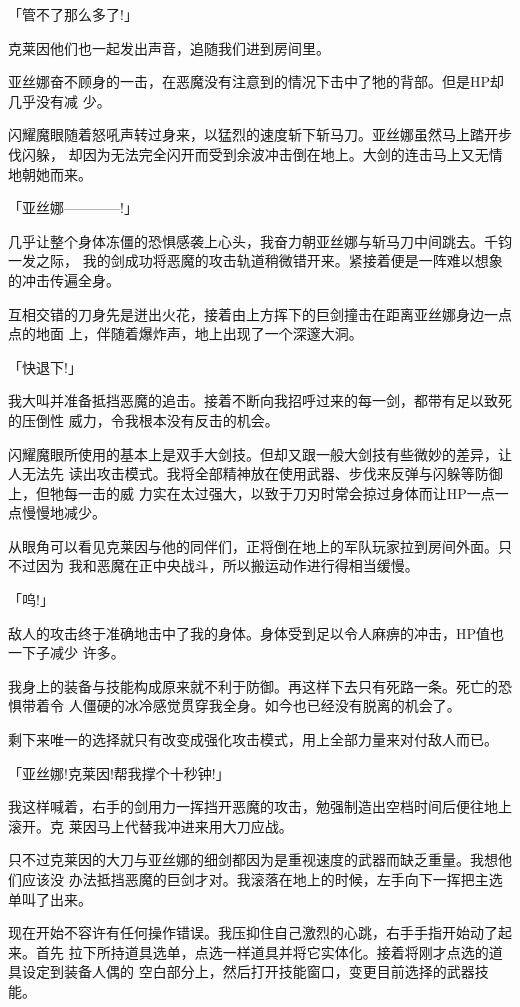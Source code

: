 \documentclass[11pt]{book}
\begin{document}
「管不了那么多了!」

克莱因他们也一起发出声音，追随我们进到房间里。

亚丝娜奋不顾身的一击，在恶魔没有注意到的情况下击中了牠的背部。但是HP却几乎没有减
少。

闪耀魔眼随着怒吼声转过身来，以猛烈的速度斩下斩马刀。亚丝娜虽然马上踏开步伐闪躲，
却因为无法完全闪开而受到余波冲击倒在地上。大剑的连击马上又无情地朝她而来。

「亚丝娜————!」

几乎让整个身体冻僵的恐惧感袭上心头，我奋力朝亚丝娜与斩马刀中间跳去。千钧一发之际，
我的剑成功将恶魔的攻击轨道稍微错开来。紧接着便是一阵难以想象的冲击传遍全身。

互相交错的刀身先是迸出火花，接着由上方挥下的巨剑撞击在距离亚丝娜身边一点点的地面
上，伴随着爆炸声，地上出现了一个深邃大洞。

「快退下!」

我大叫并准备抵挡恶魔的追击。接着不断向我招呼过来的每一剑，都带有足以致死的压倒性
威力，令我根本没有反击的机会。

闪耀魔眼所使用的基本上是双手大剑技。但却又跟一般大剑技有些微妙的差异，让人无法先
读出攻击模式。我将全部精神放在使用武器、步伐来反弹与闪躲等防御上，但牠每一击的威
力实在太过强大，以致于刀刃时常会掠过身体而让HP一点一点慢慢地减少。

从眼角可以看见克莱因与他的同伴们，正将倒在地上的军队玩家拉到房间外面。只不过因为
我和恶魔在正中央战斗，所以搬运动作进行得相当缓慢。

「呜!」

敌人的攻击终于准确地击中了我的身体。身体受到足以令人麻痹的冲击，HP值也一下子减少
许多。

我身上的装备与技能构成原来就不利于防御。再这样下去只有死路一条。死亡的恐惧带着令
人僵硬的冰冷感觉贯穿我全身。如今也已经没有脱离的机会了。

剩下来唯一的选择就只有改变成强化攻击模式，用上全部力量来对付敌人而已。

「亚丝娜!克莱因!帮我撑个十秒钟!」

我这样喊着，右手的剑用力一挥挡开恶魔的攻击，勉强制造出空档时间后便往地上滚开。克
莱因马上代替我冲进来用大刀应战。

只不过克莱因的大刀与亚丝娜的细剑都因为是重视速度的武器而缺乏重量。我想他们应该没
办法抵挡恶魔的巨剑才对。我滚落在地上的时候，左手向下一挥把主选单叫了出来。

现在开始不容许有任何操作错误。我压抑住自己激烈的心跳，右手手指开始动了起来。首先
拉下所持道具选单，点选一样道具并将它实体化。接着将刚才点选的道具设定到装备人偶的
空白部分上，然后打开技能窗口，变更目前选择的武器技能。
\end{document}
